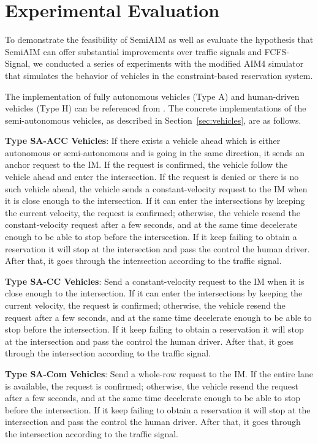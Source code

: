 \section{Experimental Evaluation}
\label{sec:simulation}

To demonstrate the feasibility of SemiAIM as well as evaluate the
hypothesis that SemiAIM can offer substantial improvements over
traffic signals and FCFS-Signal, we conducted a series of experiments
with the modified AIM4 simulator that simulates the behavior of
vehicles in the constraint-based reservation system.

The implementation of fully autonomous vehicles (Type A) and
human-driven vehicles (Type H) can be referenced from
\cite{bib:Dresner08Multiagent}.  The concrete implementations of the
semi-autonomous vehicles, as described in Section~\ref{sec:vehicles},
are as follows.

\begin{small_ind_s_itemize}

\item \textbf{Type SA-ACC Vehicles}:
If there exists a vehicle ahead which is either autonomous or
semi-autonomous and is going in the same direction, it sends an anchor
request to the IM.  If the request is confirmed, the vehicle follow
the vehicle ahead and enter the intersection.  If the request is
denied or there is no such vehicle ahead, the vehicle sends a
constant-velocity request to the IM when it is close enough to the
intersection. If it can enter the intersections by keeping the current
velocity, the request is confirmed; otherwise, the vehicle resend the
constant-velocity request after a few seconds, and at the same time
decelerate enough to be able to stop before the intersection. If it
keep failing to obtain a reservation it will stop at the intersection
and pass the control the human driver. After that, it goes through the
intersection according to the traffic signal.

\item \textbf{Type SA-CC Vehicles}:
Send a constant-velocity request to the IM when it is close
enough to the intersection. If it can enter the intersections by
keeping the current velocity, the request is confirmed; otherwise, the
vehicle resend the request after a few seconds, and at the same time
decelerate enough to be able to stop before the intersection. If it
keep failing to obtain a reservation it will stop at the intersection
and pass the control the human driver. After that, it goes through the
intersection according to the traffic signal.

\item \textbf{Type SA-Com Vehicles}:
Send a whole-row request to the IM.  If the entire lane is
available, the request is confirmed; otherwise, the vehicle resend the
request after a few seconds, and at the same time decelerate enough to
be able to stop before the intersection. If it keep failing to obtain
a reservation it will stop at the intersection and pass the control
the human driver. After that, it goes through the intersection
according to the traffic signal.
\end{small_ind_s_itemize}

